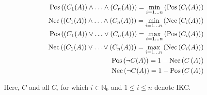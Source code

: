 \begin{align}
\operatorname{Pos}\left(\left(C_1(A)\right) \wedge \ldots \wedge \left(C_n(A)\right)\right) = \min_{i=1 \ldots n} \left(\operatorname{Pos}\left(C_i(A)\right)\right) \nonumber \\
\operatorname{Nec}\left(\left(C_1(A)\right) \wedge \ldots \wedge \left(C_n(A)\right)\right) = \min_{i=1 \ldots n} \left(\operatorname{Nec}\left(C_i(A)\right)\right) \nonumber \\
\operatorname{Pos}\left(\left(C_1(A)\right) \vee \ldots \vee \left(C_n(A)\right)\right) = \max_{i=1 \ldots n} \left(\operatorname{Pos}\left(C_i(A)\right)\right) \nonumber \\
\operatorname{Nec}\left(\left(C_1(A)\right) \vee \ldots \vee \left(C_n(A)\right)\right) = \max_{i=1 \ldots n} \left(\operatorname{Nec}\left(C_i(A)\right)\right) \nonumber \\
\operatorname{Pos}\left(\neg C(A)\right) = 1 - \operatorname{Nec}\left(C\left(A\right)\right) \nonumber \\
\operatorname{Nec}\left(\neg C(A)\right) = 1 - \operatorname{Pos}\left(C\left(A\right)\right) \nonumber
\end{align}

Here, $C$ and all $C_i$ for which $i \in \mathbb{N}_0$ and $1 \leq i \leq n$ denote IKC.


